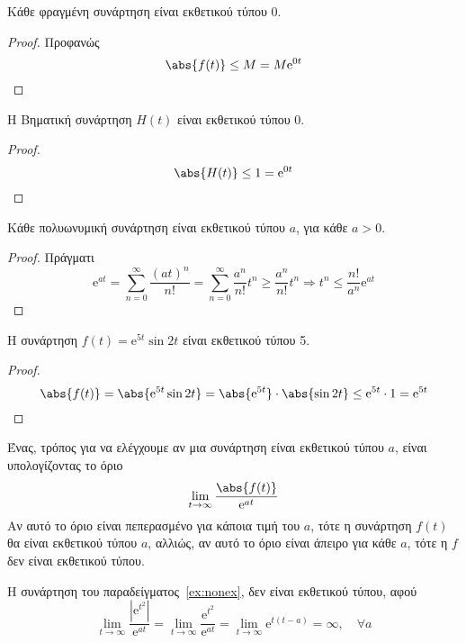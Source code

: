 \begin{prop}
  Κάθε φραγμένη συνάρτηση είναι εκθετικού τύπου 0.
\end{prop}
\begin{proof}
  Προφανώς
  \[
    \abs{f(t)} \leq M = M \mathrm{e}^{0t}
  \] 
\end{proof}

\begin{mybox3}
\begin{example}
  Η Βηματική συνάρτηση $ H(t) $ είναι εκθετικού τύπου 0.
\end{example}
\end{mybox3}
\begin{proof}
  \[
    \abs{H(t)} \leq 1 = \mathrm{e}^{0t} 
  \] 
\end{proof}

\begin{prop}
  Κάθε πολυωνυμική συνάρτηση είναι εκθετικού τύπου $a$, για κάθε $ a>0 $.
\end{prop}
\begin{proof}
  Πράγματι
  \[
    \mathrm{e}^{at} = \sum_{n=0}^{\infty} \frac{{(at)}^{n}}{n!} = \sum_{n=0}^{\infty} 
    \frac{a^{n}}{n!} t^{n} \geq \frac{a^{n}}{n!} t^{n} \Rightarrow t^{n} \leq
    \frac{n!}{a^{n}} \mathrm{e}^{at}
  \]
\end{proof}

\begin{mybox3}
\begin{example}
  Η συνάρτηση $ f(t) = \mathrm{e}^{5t} \sin{2t} $ είναι εκθετικού τύπου 5.
\end{example}
\end{mybox3}
\begin{proof}
  \[
    \abs{f(t)} = \abs{\mathrm{e}^{5t} \sin{2t}} = \abs{\mathrm{e}^{5t}} \cdot 
    \abs{\sin{2t}} \leq \mathrm{e}^{5t} \cdot 1 = \mathrm{e}^{5t}
  \] 
\end{proof}

\begin{rem}
  Ένας, τρόπος για να ελέγχουμε αν μια συνάρτηση είναι εκθετικού τύπου $a$, είναι 
  υπολογίζοντας το όριο
  \[
    \lim_{t \to \infty} \frac{\abs{f(t)}}{\mathrm{e}^{at}} 
  \] 
  Αν αυτό το όριο είναι πεπερασμένο για κάποια τιμή του $a$, τότε η συνάρτηση $ f(t)
  $ θα είναι εκθετικού τύπου $a$, αλλιώς, αν αυτό το όριο είναι άπειρο για κάθε $a$, 
  τότε η $f$ δεν είναι εκθετικού τύπου.
\end{rem}

\begin{mybox3}
\begin{example}
  Η συνάρτηση του παραδείγματος~\ref{ex:nonex}, δεν είναι εκθετικού τύπου, αφού
  \[
    \lim_{t \to \infty} \frac{|\mathrm{e}^{t^{2}}|}{\mathrm{e}^{at}} = 
    \lim_{t \to \infty} \frac{\mathrm{e}^{t^{2}}}{\mathrm{e}^{at}} = 
    \lim_{t \to \infty} \mathrm{e}^{t(t-a)} = \infty, \quad \forall a
  \]
\end{example}
\end{mybox3}

